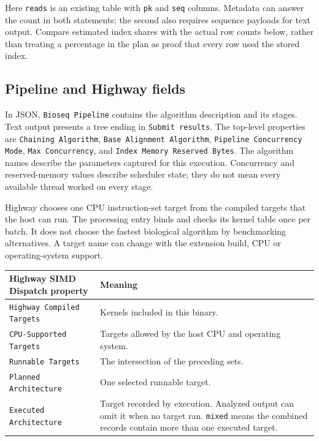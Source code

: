 Here \texttt{reads} is an existing table with \texttt{pk} and \texttt{seq}
columns. Metadata can answer the count in both statements; the second also
requires sequence payloads for text output. Compare estimated index shares
with the actual row counts below, rather than treating a percentage in the
plan as proof that every row used the stored index.

\subsection{Pipeline and Highway fields}
\label{sec:appendix-highway}

In JSON, \texttt{Bioseq Pipeline} contains the algorithm description and its
stages. Text output presents a tree ending in \texttt{Submit results}.
The top-level properties are \texttt{Chaining Algorithm},
\texttt{Base Alignment Algorithm}, \texttt{Pipeline Concurrency Mode},
\texttt{Max Concurrency}, and \texttt{Index Memory Reserved Bytes}.
The algorithm names describe the parameters captured for this execution.
Concurrency and reserved-memory values describe scheduler state; they do not
mean every available thread worked on every stage.

Highway chooses one CPU instruction-set target from the compiled targets
that the host can run. The processing entry binds and checks its kernel table
once per batch. It does not choose the fastest biological algorithm by
benchmarking alternatives. A target name can change with the extension build,
CPU or operating-system support.

\begingroup\small
\begin{longtable}{@{}p{.46\linewidth}p{.49\linewidth}@{}}
\toprule
\textbf{Highway SIMD Dispatch property} & \textbf{Meaning}\\
\midrule\endhead
\texttt{Highway Compiled Targets} & Kernels included in this binary.\\
\texttt{CPU-Supported Targets} & Targets allowed by the host CPU and
operating system.\\
\texttt{Runnable Targets} & The intersection of the preceding sets.\\
\texttt{Planned Architecture} & One selected runnable target.\\
\texttt{Executed Architecture} & Target recorded by execution. Analyzed output can omit it
when no target ran. \texttt{mixed} means the combined records contain
more than one executed target.\\
\bottomrule
\end{longtable}
\endgroup

